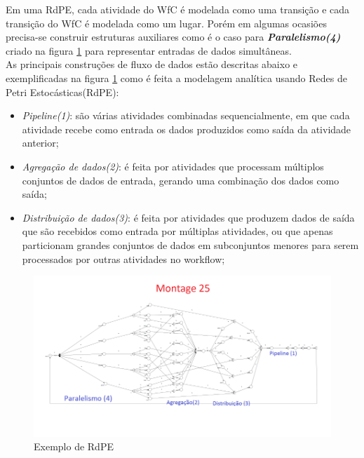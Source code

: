 \documentclass[a4paper,10pt]{article}
\begin{document}
	Em uma RdPE, cada atividade do WfC é modelada como uma transição e cada transição do WfC é modelada como um lugar. Porém em algumas ocasiões precisa-se construir estruturas auxiliares como é o caso para \textit{\textbf{Paralelismo(4)}} criado na figura \ref{RdPE_Montage} para representar entradas de dados simultâneas.	\\


		As principais construções de fluxo de dados estão descritas abaixo e exemplificadas na figura \ref{RdPE_Montage} como é feita a modelagem analítica usando Redes de Petri Estocásticas(RdPE):
		
	\begin{itemize}
		
		\item \textit{Pipeline(1)}: são várias atividades combinadas sequencialmente, em que cada atividade recebe como entrada os dados produzidos como saída da atividade anterior;
		
		\item \textit{Agregação de dados(2)}: é feita por atividades que processam múltiplos conjuntos de dados de entrada, gerando uma combinação dos dados como saída;

		\item \textit{Distribuição de dados(3)}: é feita por atividades que produzem dados de saída que são recebidos como entrada por múltiplas atividades, ou que apenas particionam grandes conjuntos de dados em subconjuntos menores para serem processados por outras atividades no workflow;

	\end{itemize}

	\begin{figure}[!htb]
		\centering
		\includegraphics{img/montage25_peq}
		\caption{Exemplo de RdPE}
		\label{RdPE_Montage}
	\end{figure}
\end{document}
